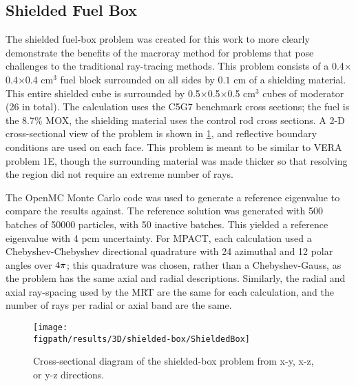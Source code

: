{{    \subsection{Shielded Fuel Box}{\label{ssec:MR:Shielded Fuel Box}
      The shielded fuel-box problem was created for this work to more clearly demonstrate the benefits of the macroray method for problems that pose challenges to the traditional ray-tracing methods.
      This problem consists of a 0.4$\times$0.4$\times$0.4 cm$^3$ fuel block surrounded on all sides by $0.1$ cm of a shielding material.
      This entire shielded cube is surrounded by 0.5$\times$0.5$\times$0.5 cm$^3$ cubes of moderator (26 in total).
      The calculation uses the C5G7 benchmark cross sections; the fuel is the 8.7\% \ac{MOX}, the shielding material uses the control rod cross sections.
      A 2-D cross-sectional view of the problem is shown in \cref{fig:MR:Shielded-Box Diagram}, and reflective boundary conditions are used on each face.
      This problem is meant to be similar to \ac{VERA} problem 1E, though the surrounding material was made thicker so that resolving the region did not require an extreme number of rays.

      The OpenMC Monte Carlo code \cite{OpenMC} was used to generate a reference eigenvalue to compare the results against.
      The reference solution was generated with 500 batches of 50000 particles, with 50 inactive batches.
      This yielded a reference eigenvalue with 4 pcm uncertainty.
      For MPACT, each calculation used a Chebyshev-Chebyshev directional quadrature with 24 azimuthal and 12 polar angles over $4\pi$;
        this quadrature was chosen, rather than a Chebyshev-Gauss, as the problem has the same axial and radial descriptions.
      Similarly, the radial and axial ray-spacing used by the \ac{MRT} are the same for each calculation, and the number of rays per radial or axial band are the same.

      \begin{figure}[h]
        \centering
        \texttt{[image: \\figpath/results/3D/shielded-box/ShieldedBox]}
        \caption{Cross-sectional diagram of the shielded-box problem from x-y, x-z, or y-z directions. \label{fig:MR:Shielded-Box Diagram}}
      \end{figure}

}}}
